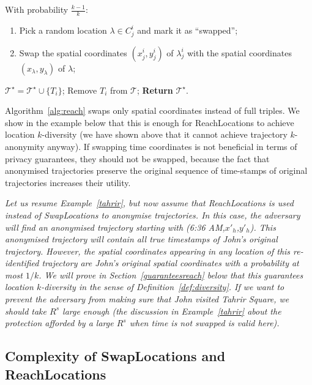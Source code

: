 \begin{algorithm}[p]
\begin{algorithmic}[1]
            \STATE With probability $\frac{k-1}{k}$:
	    \begin{enumerate}
	    \item Pick a random
	  location $\lambda \in C^i_j$ and mark it as ``swapped'';
	    \item Swap the spatial
	    coordinates $(x^i_j,y^i_j)$ of $\lambda^i_j$
	    with the spatial coordinates $(x_\lambda,y_\lambda)$
	    of $\lambda$;
	    \end{enumerate}
        \ENDIF
      \ENDIF
    \ENDFOR
    \STATE $\mathcal{T^{\star}} = \mathcal{T^{\star}} \cup \{T_i\}$;
    \STATE Remove $T_i$ from $\mathcal{T}$;
\ENDWHILE
\STATE \textbf{Return} $\mathcal{T^{\star}}$.
\end{algorithmic}
\end{algorithm}


Algorithm~\ref{alg:reach} swaps
only spatial coordinates instead of full triples.
We show in the example below that this is enough
for ReachLocations to achieve location $k$-diversity
(we have shown above that it cannot achieve trajectory
$k$-anonymity anyway). If swapping time coordinates
is not beneficial in terms of privacy guarantees,
they should not be swapped, because the fact that
anonymised trajectories preserve the original sequence
of time-stamps of original trajectories increases their utility.

\begin{example}{\em
Let us resume Example~\ref{tahrir}, but now assume that
ReachLocations is used instead of SwapLocations to anonymise
trajectories. In this case, the adversary will find
an anonymised trajectory starting with (6:36 AM,$x'_h$,$y'_h$).
This anonymised trajectory will contain all true timestamps of John's
original trajectory. However, the spatial coordinates appearing
in any location of this re-identified trajectory are John's
original spatial coordinates with a probability at most $1/k$.
We will prove in Section~\ref{guaranteesreach} below that this guarantees
location $k$-diversity in the sense of
Definition~\ref{def:diversity}. If we want to prevent the adversary
from making sure that John visited Tahrir Square, we should
take $R^s$ large enough (the discussion in Example~\ref{tahrir}
about the protection afforded by a large $R^s$ when time is
not swapped is valid here).
}\end{example}

\subsection{Complexity of SwapLocations and ReachLocations}
\label{sec:complex}

